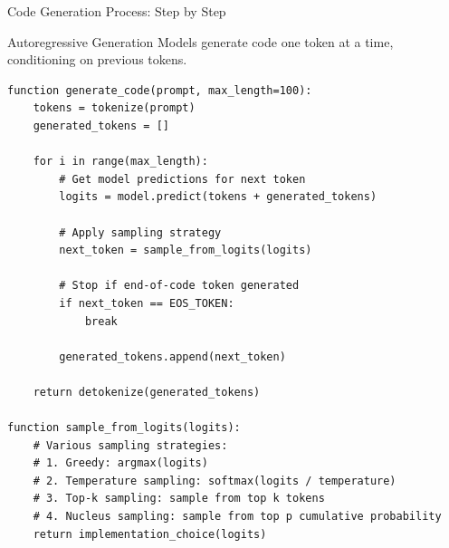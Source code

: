 \documentclass{beamer}
\begin{document}
\begin{frame}[t,fragile]{Code Generation Process: Step by Step}
    \begin{block}{Autoregressive Generation}
        Models generate code one token at a time, conditioning on previous tokens.
    \end{block}
    
    \begin{lstlisting}[style=code, basicstyle=\ttfamily\tiny]
function generate_code(prompt, max_length=100):
    tokens = tokenize(prompt)
    generated_tokens = []
    
    for i in range(max_length):
        # Get model predictions for next token
        logits = model.predict(tokens + generated_tokens)
        
        # Apply sampling strategy
        next_token = sample_from_logits(logits)
        
        # Stop if end-of-code token generated
        if next_token == EOS_TOKEN:
            break
            
        generated_tokens.append(next_token)
    
    return detokenize(generated_tokens)

function sample_from_logits(logits):
    # Various sampling strategies:
    # 1. Greedy: argmax(logits)
    # 2. Temperature sampling: softmax(logits / temperature)
    # 3. Top-k sampling: sample from top k tokens
    # 4. Nucleus sampling: sample from top p cumulative probability
    return implementation_choice(logits)
    \end{lstlisting}
\end{frame}
\end{document}
